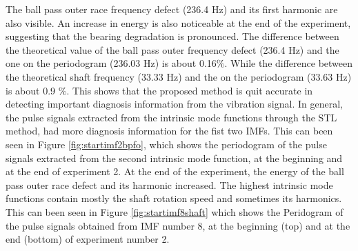 \documentclass[../Main/thesis.tex]{subfiles}
\begin{document}
The ball pass outer race frequency defect (236.4 Hz) and its first harmonic are also visible. An increase in energy is also noticeable at the end of the experiment, suggesting that the bearing degradation is pronounced.
\justify
The difference between the theoretical value of the ball pass outer frequency defect (236.4 Hz) and the one on the periodogram (236.03 Hz) is about 0.16$\%$. While the difference between the theoretical shaft frequency (33.33 Hz) and the on the periodogram (33.63 Hz) is about 0.9 $\%$. This shows that the proposed method is quit accurate in detecting important diagnosis information from the vibration signal.
\justify
In general, the pulse signals extracted from the intrinsic mode functions through the STL method, had more diagnosis information for the fist two IMFs. This can been seen in Figure \ref{fig:startimf2bpfo}, which shows the periodogram of the pulse signals extracted from the second intrinsic mode function, at the beginning and at the end of experiment 2. At the end of the experiment, the energy of the ball pass outer race defect and its harmonic increased.
\justify
The highest intrinsic mode functions contain mostly the shaft rotation speed and sometimes its harmonics. This can been seen in Figure \ref{fig:startimf8shaft} which shows the Peridogram of the pulse signals obtained from IMF number 8, at the beginning (top) and at the end (bottom) of experiment number 2.
\end{document}
